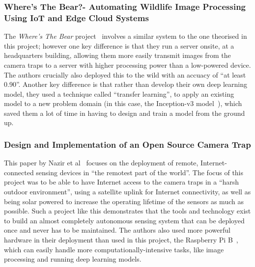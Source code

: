 \subsubsection{Where’s The Bear?- Automating Wildlife Image Processing
Using IoT and Edge Cloud Systems}
The \textit{Where's The Bear} project~\cite{elias2017s} involves a similar
system to the one theorised in this project; however one key difference is
that they run a server onsite, at a headquarters building, allowing them more
easily transmit images from the camera traps to a server with higher
processing power than a low-powered device. The authors crucially also
deployed this to the wild with an accuacy of ``at least 0.90''. Another key
difference is that rather than develop their own deep learning model, they
used a technique called ``transfer learning'', to apply an existing model to
a new problem domain (in this case, the Inception-v3
model~\cite{szegedy2016rethinking}), which saved them a lot of time in having
to design and train a model from the ground up.

\subsubsection{Design and Implementation of an Open Source Camera Trap}
This paper by Nazir et al~\cite{nazir2014design} focuses on the deployment of
remote, Internet-connected sensing devices in ``the remotest part of the
world''. The focus of this project was to be able to have Internet access to
the camera traps in a ``harsh outdoor environment'', using a satellite uplink
for Internet connectivity, as well as being solar powered to increase the
operating lifetime of the sensors as much as possible. Such a project like
this demonstrates that the tools and technology exist to build an almost
completely autonomous sensing system that can be deployed once and never has
to be maintained. The authors also used more powerful hardware in their
deployment than used in this project, the Raspberry Pi B~\cite{raspberrypib},
which can easily handle more computationally-intensive tasks, like image
processing and running deep learning models.